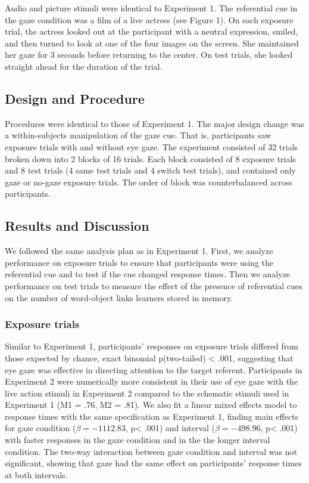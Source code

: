 \documentclass[12pt,]{article}
\begin{document}
Audio and picture stimuli were identical to Experiment 1. The
referential cue in the gaze condition was a film of a live actress (see
Figure 1). On each exposure trial, the actress looked out at the
participant with a neutral expression, smiled, and then turned to look
at one of the four images on the screen. She maintained her gaze for 3
seconds before returning to the center. On test trials, she looked
straight ahead for the duration of the trial.

\subsection{Design and Procedure}\label{design-and-procedure-1}

Procedures were identical to those of Experiment 1. The major design
change was a within-subjects manipulation of the gaze cue. That is,
participants saw exposure trials with and without eye gaze. The
experiment consisted of 32 trials broken down into 2 blocks of 16
trials. Each block consisted of 8 exposure trials and 8 test trials (4
same test trials and 4 switch test trials), and contained only gaze or
no-gaze exposure trials. The order of block was counterbalanced across
participants.

\subsection{Results and Discussion}\label{results-and-discussion-1}

We followed the same analysis plan as in Experiment 1. First, we analyze
performance on exposure trials to ensure that participants were using
the referential cue and to test if the cue changed response times. Then
we analyze performance on test trials to measure the effect of the
presence of referential cues on the number of word-object links learners
stored in memory.

\subsubsection{Exposure trials}\label{exposure-trials-1}

Similar to Experiment 1, participants' responses on exposure trials
differed from those expected by chance, exact binomial p(two-tailed)
\textless{} .001, suggesting that eye gaze was effective in directing
attention to the target referent. Participants in Experiment 2 were
numerically more consistent in their use of eye gaze with the live
action stimuli in Experiment 2 compared to the schematic stimuli used in
Experiment 1 (M1 = .76, M2 = .81). We also fit a linear mixed effects
model to response times with the same specification as Experiment 1,
finding main effects for gaze condition (\(\beta = -1112.83\),
p\textless{} .001) and interval (\(\beta = -498.96\), p\textless{} .001)
with faster responses in the gaze condition and in the the longer
interval condition. The two-way interaction between gaze condition and
interval was not significant, showing that gaze had the same effect on
participants' response times at both intervals.
\end{document}
